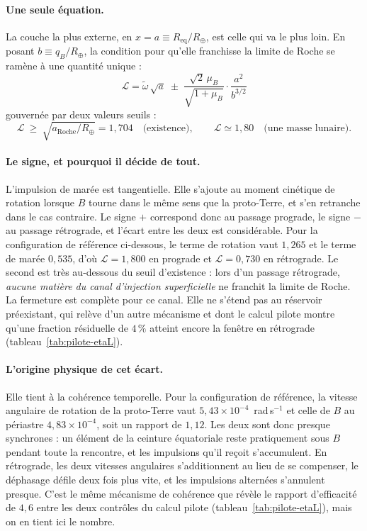 \documentclass[11pt,a4paper,openany]{report}
\newcommand{\Rt}{R_{\oplus}}
\newcommand{\Req}{R_{\mathrm{eq}}}
\newcommand{\aR}{a_{\mathrm{Roche}}}
\begin{document}
\paragraph{Une seule équation.} La couche la plus externe, en $x=a\equiv\Req/\Rt$, est celle qui va
le plus loin. En posant $b\equiv q_B/\Rt$, la condition pour qu'elle franchisse la limite de Roche
se ramène à une quantité unique :
\begin{equation}
\boxed{\;
\mathcal{L}
=\tilde\omega\,\sqrt{a}
\;\pm\;\frac{\sqrt2\,\mu_B}{\sqrt{1+\mu_B}}\cdot\frac{a^{2}}{b^{3/2}}\;}
\label{eq:equation-lune}
\end{equation}
gouvernée par deux valeurs seuils :
\begin{equation}
\mathcal{L}\ \ge\ \sqrt{\aR/\Rt}=1{,}704
\quad\text{(existence)},
\qquad
\mathcal{L}\simeq1{,}80
\quad\text{(une masse lunaire)}.
\label{eq:seuils-lune}
\end{equation}

\paragraph{Le signe, et pourquoi il décide de tout.} L'impulsion de marée est tangentielle. Elle
s'ajoute au moment cinétique de rotation lorsque $B$ tourne dans le même sens que la proto-Terre,
et s'en retranche dans le cas contraire. Le signe $+$ correspond donc au passage prograde, le signe
$-$ au passage rétrograde, et l'écart entre les deux est considérable. Pour la configuration de
référence ci-dessous, le terme de rotation vaut $1{,}265$ et le terme de marée $0{,}535$, d'où
$\mathcal{L}=1{,}800$ en prograde et $\mathcal{L}=0{,}730$ en rétrograde. Le second est très
au-dessous du seuil d'existence : lors d'un passage rétrograde, \emph{aucune matière du canal
d'injection superficielle} ne franchit la limite de Roche. La fermeture est complète pour ce canal.
Elle ne s'étend pas au réservoir préexistant, qui relève d'un autre mécanisme et dont le calcul
pilote montre qu'une fraction résiduelle de $4\,\%$ atteint encore la fenêtre en rétrograde
(tableau~\ref{tab:pilote-etaL}).

\paragraph{L'origine physique de cet écart.} Elle tient à la cohérence temporelle. Pour la
configuration de référence, la vitesse angulaire de rotation de la proto-Terre vaut
$5{,}43\times10^{-4}$~rad\,s$^{-1}$ et celle de $B$ au périastre $4{,}83\times10^{-4}$, soit un
rapport de $1{,}12$. Les deux sont donc presque synchrones : un élément de la ceinture équatoriale
reste pratiquement sous $B$ pendant toute la rencontre, et les impulsions qu'il reçoit s'accumulent.
En rétrograde, les deux vitesses angulaires s'additionnent au lieu de se compenser, le déphasage
défile deux fois plus vite, et les impulsions alternées s'annulent presque. C'est le même
mécanisme de cohérence que révèle le rapport d'efficacité de $4{,}6$ entre les deux contrôles du
calcul pilote (tableau~\ref{tab:pilote-etaL}), mais on en tient ici le nombre.
\end{document}
